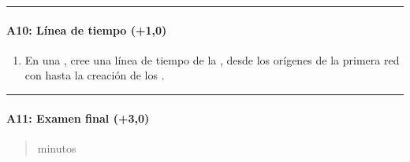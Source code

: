 \documentclass[letterpaper,10pt,spanish]{sphinxmanual}
\begin{document}
\bigskip\hrule\bigskip



\paragraph{A10: Línea de tiempo (+1,0)}
\label{\detokenize{cursos/informatica10/periodo01/G01:a10-linea-de-tiempo-1-0}}
\sphinxAtStartPar
{}
\begin{enumerate}
%
\item {} 
\sphinxAtStartPar
En una , cree una línea de tiempo de la , desde los orígenes de la primera red con  hasta la creación de los .

\end{enumerate}


\bigskip\hrule\bigskip



\paragraph{A11: Examen final (+3,0)}
\label{\detokenize{cursos/informatica10/periodo01/G01:a11-examen-final-3-0}}
\sphinxAtStartPar
{}
\begin{quote}\begin{description}
 minutos


\end{description}\end{quote}
\end{document}
